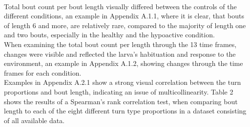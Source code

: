 \documentclass[a4paper,12pt]{article}
\begin{document}
\\Total bout count per bout length visually differed between the controls of the different conditions, an example in Appendix A.1.1, where it is clear, that bouts of length 6 and more, are relatively rare, compared to the majority of length one and two bouts, especially in the healthy and the hypoactive condition. \\When examining the total bout count per length through the 13 time frames, changes were visible and reflected the larva's habituation and response to the environment, an example in Appendix A.1.2, showing changes through the time frames for each condition.
\\Examples in Appendix A.2.1 show a strong visual correlation between the turn proportions and bout length, indicating an issue of multicollinearity. Table 2 shows the results of a Spearman's rank correlation test, when comparing bout length to each of the eight different turn type proportions in a dataset consisting of all available data.
\end{document}
